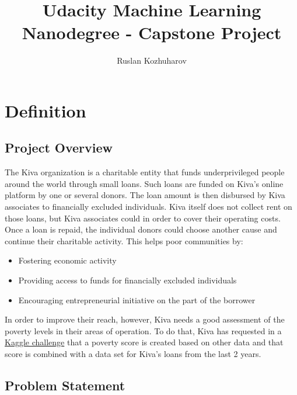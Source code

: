 \documentclass{article}
\title{Udacity Machine Learning Nanodegree - Capstone Project}
\author{Ruslan Kozhuharov}
\begin{document}
\maketitle
\tableofcontents
\newpage
{}
\setlength{\parskip}{1em}

\section{Definition}
\subsection{Project Overview}
The Kiva organization is a charitable entity that funds underprivileged people around the world through small loans. Such loans are funded on Kiva’s online platform by one or several donors. The loan amount is then disbursed by Kiva associates to financially excluded individuals. Kiva itself does not collect rent on those loans, but Kiva associates could in order to cover their operating costs. Once a loan is repaid, the individual donors could choose another cause and continue their charitable activity. This helps poor communities by:
\begin{itemize}
  \item Fostering economic activity
  \item Providing access to funds for financially excluded individuals
  \item Encouraging entrepreneurial initiative on the part of the borrower
\end{itemize}
In order to improve their reach, however, Kiva needs a good assessment of the poverty levels in their areas of operation. To do that, Kiva has requested in a \href{https://www.kaggle.com/kiva/data-science-for-good-kiva-crowdfunding}{Kaggle challenge} that a poverty score is created based on other data and that score is combined with a data set for Kiva’s loans from the last 2 years.
\hypertarget{prob_statement}{\subsection{Problem Statement}}
\end{document}
